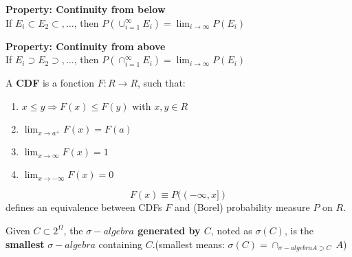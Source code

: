 \documentclass{article}
\begin{document}
\textbf{Property: Continuity from below}\\
If $E_i \subset E_2 \subset,\ldots $, then $P(\cup_{i=1}^{\infty} E_i) = \lim_{i \to \infty} P(E_i)$

\textbf{Property: Continuity from above}\\
If $E_i \supset E_2 \supset,\ldots $, then $P(\cap_{i=1}^{\infty} E_i) = \lim_{i \to \infty} P(E_i)$

\begin{definition}
A \textbf{CDF} is a fonction $F: R \rightarrow R$, such that:
\begin{enumerate}
\item $x \leq y \Rightarrow F(x) \leq F(y)$ with $x,y \in R$
\item $\lim_{x \to a^{+}}F(x) = F(a)$
\item $\lim_{x \to \infty}F(x) = 1$
\item $\lim_{x \to -\infty}F(x) = 0$
\end{enumerate}
\end{definition}

\begin{theorem}
$$F(x) \equiv P((-\infty, x])$$
defines an equivalence between CDFs $F$ and (Borel) probability measure $P$ on $R$.
\end{theorem}

\begin{definition}
Given $C \subset 2^{\Omega}$, the \textbf{$\sigma-algebra$ generated by $C$}, noted as $\sigma(C)$, is the \textbf{smallest} $\sigma-algebra$ containing $C$.(smallest means: $\sigma(C) = \cap_{\sigma-algebra A \supset C}\ A$)
\end{definition}
\end{document}
